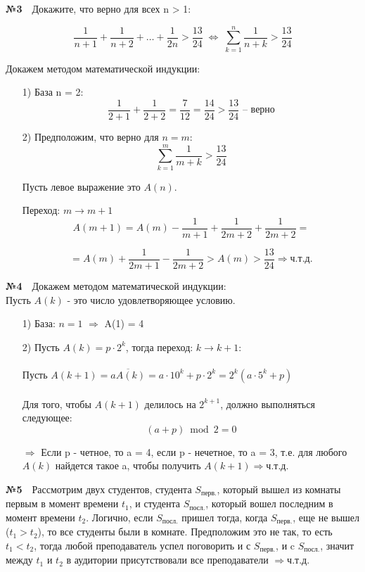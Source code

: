 \documentclass[a4paper, 12pt]{article}
\begin{document}
	\textbf{№3}\
	\
	Докажите, что верно для всех n > 1:
	
	\[
		\frac{1}{n + 1} + \frac{1}{n + 2} + \dots + \frac{1}{2n} > \frac{13}{24} \; \Longleftrightarrow \; \sum_{k = 1}^{n} \frac{1}{n + k} > \frac{13}{24} 
	\]
	
	Докажем методом математической индукции:\
	\begin{enumerate}
		\item[1)] База n = 2: 
		\[
			\frac{1}{2 + 1} + \frac{1}{2 + 2} = \frac{7}{12} = \frac{14}{24} > \frac{13}{24} \text{ -- верно}
		\] 
		
		\item[2)] Предположим, что верно для $n = m$:
		\[
			\sum_{k = 1}^{m} \frac{1}{m + k} > \frac{13}{24}	
		\] 
		
		Пусть левое выражение это $A(n)$.
		
		Переход: $m \rightarrow m + 1$\\
		\[
			A(m + 1) = A(m) - \frac{1}{m + 1} + \frac{1}{2m + 2} + \frac{1}{2m + 2} =	
		\] 
		
		\[
			= A(m) + \frac{1}{2m + 1} - \frac{1}{2m + 2} > A(m) > \frac{13}{24} \Rightarrow ч.т.д.	
		\]
	\end{enumerate}

	\textbf{№4}\
	\
	Докажем методом математической индукции:\\
	Пусть $A(k)$ - это число удовлетворяющее условию.
	\begin{enumerate}
		\item[1)] База: $n = 1$ $\Rightarrow$ A(1) = 4
		\item[2)] Пусть $A(k) = p \cdot 2^k$, тогда переход: $k \rightarrow k + 1$:\\
		\\
		Пусть $A(k + 1) = \overline{aA(k)} = a \cdot 10^k + p \cdot 2^k = 2^k (a \cdot 5^k + p)$\\
		\\
		Для того, чтобы $A(k + 1)$ делилось на $2^{k + 1}$, должно выполняться следующее: \\
		\[
		(a + p) \bmod 2 = 0
		\]
		
		$\Rightarrow$ Если p - четное, то a = 4, если p - нечетное, то a = 3, т.е. для любого $A(k)$ найдется такое a, чтобы получить $A(k + 1) \Rightarrow ч.т.д.$  
	\end{enumerate}
	
	\textbf{№5}\
	\
	Рассмотрим двух студентов, студента $S_{перв.}$, который вышел из комнаты первым в момент времени $t_{1}$, и студента $S_{посл.}$, который вошел последним в момент времени $t_{2}$. Логично, если $S_{посл.}$ пришел тогда, когда $S_{перв.}$, еще не вышел ($t_{1} > t_{2}$), то все студенты были в комнате. Предположим это не так, то есть $t_{1} < t_{2}$, тогда любой преподаватель успел поговорить и с $S_{перв.}$, и c $S_{посл.}$, значит между $t_{1}$ и $t_{2}$ в аудитории присутствовали все преподаватели $\Rightarrow ч.т.д.$
	
\end{document}
